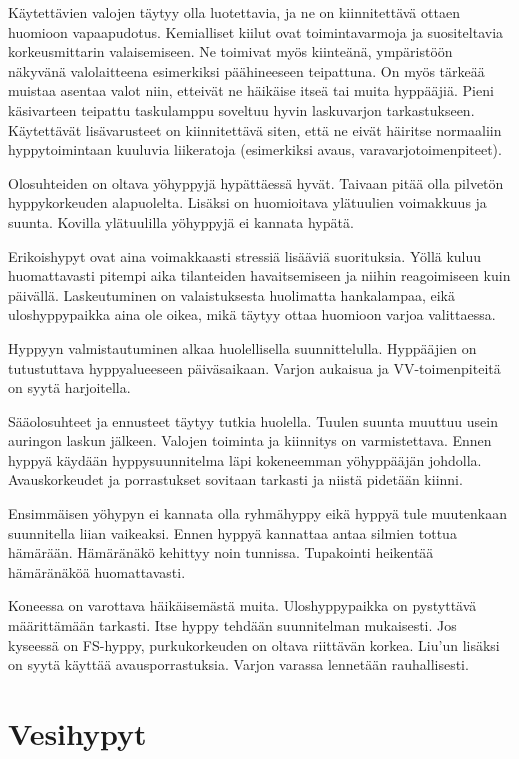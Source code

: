Käytettävien valojen täytyy olla luotettavia, ja ne on kiinnitettävä ottaen huomioon vapaapudotus. Kemialliset kiilut ovat toimintavarmoja ja suositeltavia korkeusmittarin valaisemiseen. Ne toimivat myös kiinteänä, ympäristöön näkyvänä valolaitteena esimerkiksi päähineeseen teipattuna. On myös tärkeää muistaa asentaa valot niin, etteivät ne häikäise itseä tai muita hyppääjiä. Pieni käsivarteen teipattu taskulamppu soveltuu hyvin laskuvarjon tarkastukseen. Käytettävät lisävarusteet on kiinnitettävä siten, että ne eivät häiritse normaaliin hyppytoimintaan kuuluvia liikeratoja (esimerkiksi avaus, varavarjotoimenpiteet). 


Olosuhteiden on oltava yöhyppyjä hypättäessä hyvät. Taivaan pitää olla pilvetön hyppykorkeuden alapuolelta. Lisäksi on huomioitava ylätuulien voimakkuus ja suunta. Kovilla ylätuulilla yöhyppyjä ei kannata hypätä. 


Erikoishypyt ovat aina voimakkaasti stressiä lisääviä suorituksia. Yöllä kuluu huomattavasti pitempi aika tilanteiden havaitsemiseen ja niihin reagoimiseen kuin päivällä. Laskeutuminen on valaistuksesta huolimatta hankalampaa, eikä uloshyppypaikka aina ole oikea, mikä täytyy ottaa huomioon varjoa valittaessa. 


Hyppyyn valmistautuminen alkaa huolellisella suunnittelulla. Hyppääjien on tutustuttava hyppyalueeseen päiväsaikaan. Varjon aukaisua ja VV-toimenpiteitä on syytä harjoitella.  


Sääolosuhteet ja ennusteet täytyy tutkia huolella. Tuulen suunta muuttuu usein auringon laskun jälkeen. Valojen toiminta ja kiinnitys on varmistettava. Ennen hyppyä käydään hyppysuunnitelma läpi kokeneemman yöhyppääjän johdolla. Avauskorkeudet ja porrastukset sovitaan tarkasti ja niistä pidetään kiinni.  


Ensimmäisen yöhypyn ei kannata olla ryhmähyppy eikä hyppyä tule muutenkaan suunnitella liian vaikeaksi. Ennen hyppyä kannattaa antaa silmien tottua hämärään. Hämäränäkö kehittyy noin tunnissa. Tupakointi heikentää hämäränäköä huomattavasti. 


Koneessa on varottava häikäisemästä muita. Uloshyppypaikka on pystyttävä määrittämään tarkasti. Itse hyppy tehdään suunnitelman mukaisesti. Jos kyseessä on FS-hyppy, purkukorkeuden on oltava riittävän korkea. Liu’un lisäksi on syytä käyttää avausporrastuksia. Varjon varassa lennetään rauhallisesti. 

\section{ Vesihypyt }
\label{erikoishypyt-vesihypyt}


